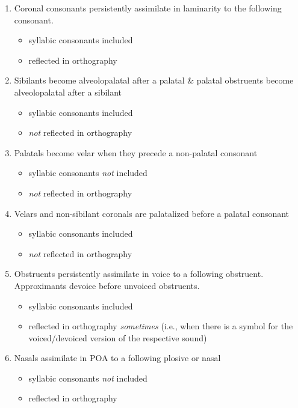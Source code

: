 \documentclass[10pt]{article}
\begin{document}
\begin{enumerate}
    \item Coronal consonants persistently assimilate in laminarity to the following consonant.
    \begin{itemize}
        \item syllabic consonants included
        \item reflected in orthography
    \end{itemize}
    \item Sibilants become alveolopalatal after a palatal \& palatal obstruents become alveolopalatal after a sibilant
    \begin{itemize}
        \item syllabic consonants included
        \item \emph{not} reflected in orthography
    \end{itemize}
    \item Palatals become velar when they precede a non-palatal consonant
    \begin{itemize}
        \item syllabic consonants \emph{not} included
        \item \emph{not} reflected in orthography
    \end{itemize}
    \item Velars and non-sibilant coronals are palatalized before a palatal consonant
    \begin{itemize}
        \item syllabic consonants included
        \item \emph{not} reflected in orthography
    \end{itemize}
    \item Obstruents persistently assimilate in voice to a following obstruent. Approximants devoice before unvoiced obstruents.
    \begin{itemize}
        \item syllabic consonants included
        \item reflected in orthography \emph{sometimes} (i.e., when there is a symbol for the voiced/devoiced version of the respective sound)
    \end{itemize}
    \item Nasals assimilate in POA to a following plosive or nasal
    \begin{itemize}
        \item syllabic consonants \emph{not} included
        \item reflected in orthography

\end{itemize}
\end{enumerate}
\end{document}
